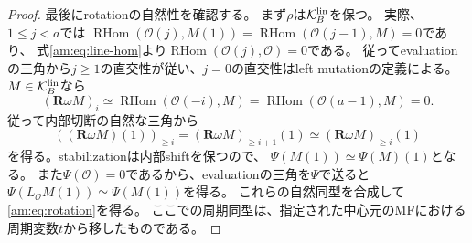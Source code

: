 \begin{proof}
最後にrotationの自然性を確認する。
まず$\rho$は$\mathcal K_B^{\rm lin}$を保つ。
実際、$1\le j<a$では
$\operatorname{RHom}(\mathcal O(j),M(1))
=\operatorname{RHom}(\mathcal O(j-1),M)=0$であり、
式\eqref{am:eq:line-hom}より$\operatorname{RHom}(\mathcal O(j),\mathcal O)=0$である。
従ってevaluationの三角から$j\ge1$の直交性が従い、$j=0$の直交性はleft mutationの定義による。
$M\in\mathcal K_B^{\rm lin}$なら
\[
 (\mathbf R\omega M)_i
 \simeq\operatorname{RHom}(\mathcal O(-i),M)
 =\operatorname{RHom}(\mathcal O(a-1),M)=0.
\]
従って内部切断の自然な三角から
\[
 ((\mathbf R\omega M)(1))_{\ge i}
 =(\mathbf R\omega M)_{\ge i+1}(1)
 \simeq(\mathbf R\omega M)_{\ge i}(1)
\]
を得る。stabilizationは内部shiftを保つので、
$\Psi(M(1))\simeq\Psi(M)(1)$となる。
また$\Psi(\mathcal O)=0$であるから、evaluationの三角を$\Psi$で送ると
$\Psi(L_{\mathcal O}M(1))\simeq\Psi(M(1))$を得る。
これらの自然同型を合成して\eqref{am:eq:rotation}を得る。
ここでの周期同型は、指定された中心元のMFにおける周期変数$t$から移したものである。
\end{proof}

